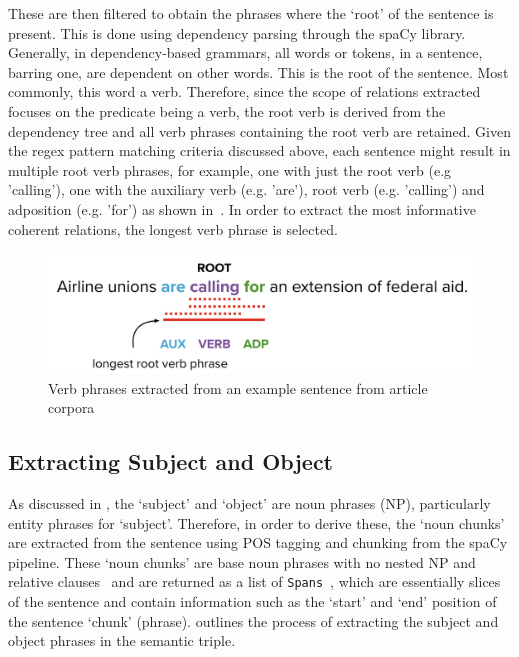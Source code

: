 These are then filtered to obtain the phrases where the `root' of the sentence is present. This is done using dependency parsing through the spaCy library. Generally, in dependency-based grammars, all words or tokens, in a sentence,  barring one,  are dependent on other words.  This is the root  of the sentence. Most commonly, this word a verb. Therefore, since the scope of relations extracted focuses on the predicate being a verb, the root verb is derived from the dependency tree and all verb phrases containing the root verb are retained. Given the regex pattern matching criteria discussed above, each sentence might result in multiple root verb phrases, for example, one with just the root verb (e.g 'calling'), one with the auxiliary verb (e.g. 'are'), root verb (e.g. 'calling') and adposition (e.g. 'for') as shown in~. In order to extract the most informative coherent relations, the longest verb phrase is selected. 

\begin{figure}[H]
\centering
\includegraphics[scale=0.3]{images/verb_phrases.png}
\caption{Verb phrases extracted from an example sentence from article corpora}
\label{verb_phrases}
\end{figure}

\subsection{Extracting Subject and Object} \label{extracting_subj_obj}
As discussed in , the `subject' and `object' are noun phrases (NP), particularly entity phrases for `subject'. Therefore, in order to derive these, the `noun chunks' are extracted from the sentence using POS tagging and chunking from the spaCy pipeline. These `noun chunks' are base noun phrases with no nested NP and relative clauses~\cite{spacy} and are returned as a list of \texttt{Spans}~\cite{spacy}, which are essentially slices of the sentence and contain information such as the `start' and `end' position of the sentence `chunk' (phrase).  outlines the process of extracting the subject and object phrases in the semantic triple.

